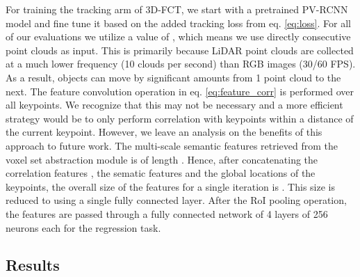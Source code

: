 \documentclass[10pt,twocolumn,letterpaper]{article}
\begin{document}
 For training the tracking arm of 3D-FCT, we start with a pretrained PV-RCNN model and fine tune it based on the added tracking loss from eq. \ref{eq:loss}. For all of our evaluations we utilize a value of , which means we use directly consecutive point clouds as input. This is primarily because LiDAR point clouds are collected at a much lower frequency (10 clouds per second) than RGB images (30/60 FPS). As a result, objects can move by significant amounts from 1 point cloud to the next. The feature convolution operation in eq. \ref{eq:feature_corr} is performed over all  keypoints. We recognize that this may not be necessary and a more efficient strategy would be to only perform correlation with keypoints within a distance of the current keypoint. However, we leave an analysis on the benefits of this approach to future work. The multi-scale semantic features retrieved from the voxel set abstraction module is of length . Hence, after concatenating the correlation features , the sematic features  and the global locations of the keypoints, the overall size of the features for a single iteration is . This size is reduced to  using a single fully connected layer. After the RoI pooling operation, the features are passed through a fully connected network of 4 layers of 256 neurons each for the regression task.

\subsection{Results}
\begin{table}
   \centering
   \caption{Ablation study on effect of track regression and tracklet linking. PV-RCNN \cite{Shi_2020_CVPR} acts as the baseline.}
   \label{tab:ablation}
\end{table}
\end{document}
